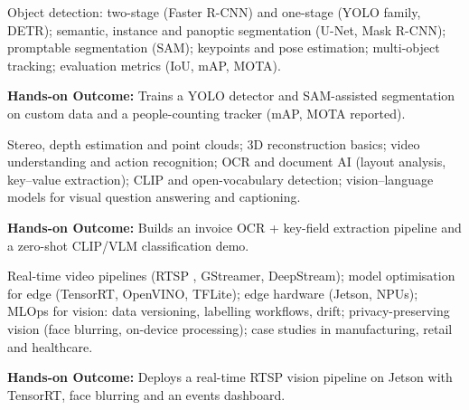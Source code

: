 \documentclass[10pt,a4paper]{article}
\begin{document}
\begin{tcolorbox}[unitbox,title={{\color{gold}UNIT III}\quad Detection, Segmentation and Tracking\hfill{\color{gold}9 Hours}}]\small Object detection: two-stage (Faster R-CNN) and one-stage (YOLO family, DETR); semantic, instance and panoptic segmentation (U-Net, Mask R-CNN); promptable segmentation (SAM); keypoints and pose estimation; multi-object tracking; evaluation metrics (IoU, mAP, MOTA).\par\vspace{2pt}\par\textbf{Hands-on Outcome:} Trains a YOLO detector and SAM-assisted segmentation on custom data and a people-counting tracker (mAP, MOTA reported).\end{tcolorbox}
\begin{tcolorbox}[unitbox,title={{\color{gold}UNIT IV}\quad 3D, Video and Vision–Language Models\hfill{\color{gold}9 Hours}}]\small Stereo, depth estimation and point clouds; 3D reconstruction basics; video understanding and action recognition; OCR and document AI (layout analysis, key–value extraction); CLIP and open-vocabulary detection; vision–language models for visual question answering and captioning.\par\vspace{2pt}\par\textbf{Hands-on Outcome:} Builds an invoice OCR + key-field extraction pipeline and a zero-shot CLIP/VLM classification demo.\end{tcolorbox}
\begin{tcolorbox}[unitbox,title={{\color{gold}UNIT V}\quad Edge Deployment and Vision Product Engineering\hfill{\color{gold}9 Hours}}]\small Real-time video pipelines (RTSP , GStreamer, DeepStream); model optimisation for edge (TensorRT, OpenVINO, TFLite); edge hardware (Jetson, NPUs); MLOps for vision: data versioning, labelling workflows, drift; privacy-preserving vision (face blurring, on-device processing); case studies in manufacturing, retail and healthcare.\par\vspace{2pt}\par\textbf{Hands-on Outcome:} Deploys a real-time RTSP vision pipeline on Jetson with TensorRT, face blurring and an events dashboard.\end{tcolorbox}
\end{document}
